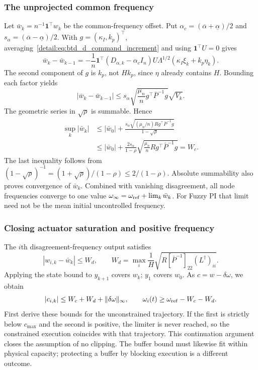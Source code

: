 \subsubsection{The unprojected common frequency}
Let $\bar w_k=n^{-1}\mathbf1^\top w_k$ be the common-frequency offset.
Put $\alpha_c=(\overline\alpha+\underline\alpha)/2$ and
$s_\alpha=(\overline\alpha-\underline\alpha)/2$. With
$g=(\kappa_I,k_p)^\top$, averaging~\eqref{detail:eq:btd_d_command_increment}
and using $\mathbf1^\top U=0$ gives
\begin{equation}
 \bar w_k-\bar w_{k-1}
 =-\frac1n\mathbf1^\top(D_{\alpha,k}-\alpha_c I_n)
 U\Lambda^{1/2}(\kappa_I\xi_k+k_p\eta_k).
 \label{detail:eq:btd_d_common_increment}
\end{equation}
The second component of $g$ is $k_p$, not $Hk_p$, since $\eta$ already
contains $H$. Bounding each factor yields
\begin{equation}
 |\bar w_k-\bar w_{k-1}|
 \le s_\alpha\sqrt{\frac{\mu_n}{n}g^\top\bar P^{-1}g}\sqrt{V_k}.
 \label{detail:eq:btd_d_common_step_bound}
\end{equation}
The geometric series in $\sqrt{\rho}$ is summable. Hence
\begin{align}
 \sup_k|\bar w_k|
 &\le |\bar w_0|+
 \frac{s_\alpha\sqrt{(\mu_n/n)R g^\top\bar P^{-1}g}}{1-\sqrt\rho}
 \nonumber\\
 &\le |\bar w_0|+\frac{2s_\alpha}{1-\rho}
 \sqrt{\frac{\mu_n}{n}R g^\top\bar P^{-1}g}=W_c.
 \label{detail:eq:btd_clock_bounds}
\end{align}
The last inequality follows from
$(1-\sqrt\rho)^{-1}=(1+\sqrt\rho)/(1-\rho)\le2/(1-\rho)$.
Absolute summability also proves convergence of $\bar w_k$. Combined with
vanishing disagreement, all node frequencies converge to one value
$\omega_\infty=\omega_{\rm ref}+\lim_k\bar w_k$.
For Fuzzy PI that limit need not be the mean initial uncontrolled frequency.

\subsubsection{Closing actuator saturation and positive frequency}
The $i$th disagreement-frequency output satisfies
\begin{equation}
 |w_{i,k}-\bar w_k|\le W_d,
 \qquad W_d=\max_i\frac1H
 \sqrt{R[\bar P^{-1}]_{22}(L^\dagger)_{ii}}.
 \label{detail:eq:btd_d_node_frequency}
\end{equation}
Applying the state bound to $y_{k+1}$ covers $w_k$; $y_1$ covers $w_0$.
As $c=w-\delta\omega$, we obtain
\begin{equation}
 |c_{i,k}|\le W_c+W_d+\|\delta\omega\|_\infty,
 \qquad \omega_i(t)\ge\omega_{\rm ref}-W_c-W_d.
 \label{detail:eq:btd_actuator_bounds}
\end{equation}
First derive these bounds for the unconstrained trajectory. If the first
is strictly below $c_{\max}$ and the second is positive, the limiter is
never reached, so the constrained execution coincides with that trajectory.
This continuation argument closes the assumption of no clipping. The
buffer bound must likewise fit within physical capacity; protecting a
buffer by blocking execution is a different outcome.

